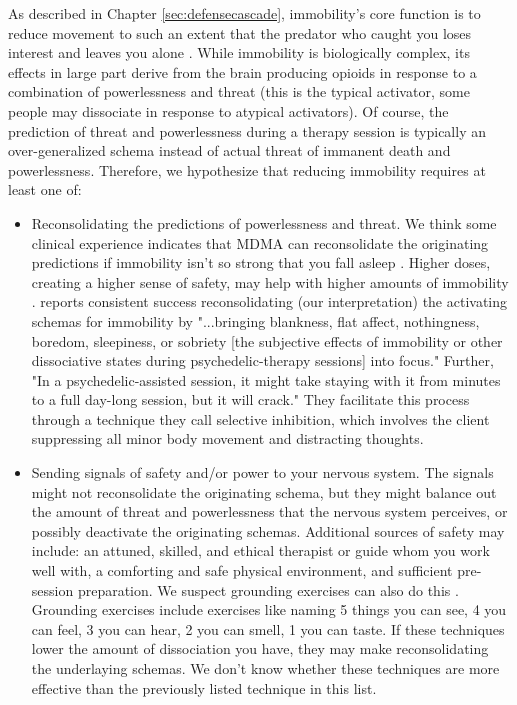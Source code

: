 \documentclass[12pt,letterpaper]{book}
\begin{document}
As described in Chapter \ref{sec:defensecascade}, immobility's core function is to reduce movement to such an extent that the predator who caught you loses interest and leaves you alone \cite{kozlowskaDefenseCascade}. While immobility is biologically complex, its effects in large part derive from the brain producing opioids in response to a combination of powerlessness and threat (this is the typical activator, some people may dissociate in response to atypical activators). Of course, the prediction of threat and powerlessness during a therapy session is typically an over-generalized schema instead of actual threat of immanent death and powerlessness. Therefore, we hypothesize that reducing immobility requires at least one of:
\begin{itemize}
	\item Reconsolidating the predictions of powerlessness and threat. We think some clinical experience indicates that MDMA can reconsolidate the originating predictions if immobility isn't so strong that you fall asleep \cite{razviPSIP}. Higher doses, creating a higher sense of safety, may help with higher amounts of immobility \cite{regan2021Connection}. \textcite{razviPSIP} reports consistent success reconsolidating (our interpretation) the activating schemas for immobility by "...bringing blankness, flat affect, nothingness, boredom, sleepiness, or sobriety [the subjective effects of immobility or other dissociative states during psychedelic-therapy sessions] into focus." Further, "In a psychedelic-assisted session, it might take staying with it from minutes to a full day-long session, but it will crack." They facilitate this process through a technique they call selective inhibition, which involves the client suppressing all minor body movement and distracting thoughts.
	\item Sending signals of safety and/or power to your nervous system. The signals might not reconsolidate the originating schema, but they might balance out the amount of threat and powerlessness that the nervous system perceives, or possibly deactivate the originating schemas. Additional sources of safety may include: an attuned, skilled, and ethical therapist or guide whom you work well with, a comforting and safe physical environment, and sufficient pre-session preparation. We suspect grounding exercises can also do this \cite{fisherGrounding}. Grounding exercises include exercises like naming 5 things you can see, 4 you can feel, 3 you can hear, 2 you can smell, 1 you can taste. If these techniques lower the amount of dissociation you have, they may make reconsolidating the underlaying schemas. We don't know whether these techniques are more effective than the previously listed technique in this list.

\end{itemize}
\end{document}
